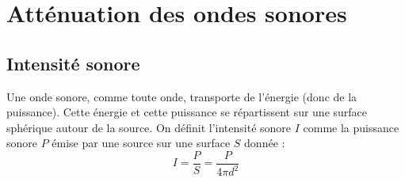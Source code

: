\documentclass[a4paper,11pt,fleqn]{article}%
\begin{document}
\maketitle

\section{Atténuation des ondes sonores}
	\subsection{Intensité sonore}
	\begin{minipage}{.7\textwidth}
	Une onde sonore, comme toute onde, transporte de l'énergie (donc de la puissance). Cette énergie et cette puissance se répartissent sur une surface sphérique autour de la source. On définit l'intensité sonore $I$ comme la puissance sonore $P$ émise par une source sur une surface $S$ donnée :
	$$I = \dfrac{P}{S} = \dfrac{P}{4\pi d^2} \nonumber$$
	\end{minipage}
	\begin{minipage}{.2\textwidth}
	\end{minipage}
	
\end{document}
